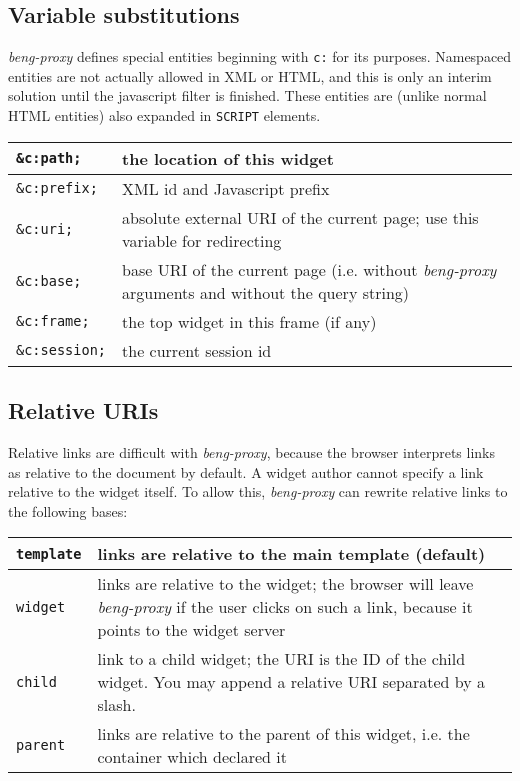 \documentclass[a4paper,12pt]{article}
\begin{document}
\subsection{Variable substitutions}

\emph{beng-proxy} defines special entities beginning with \texttt{c:}
for its purposes.  Namespaced entities are not actually allowed in XML
or HTML, and this is only an interim solution until the javascript
filter is finished.  These entities are (unlike normal HTML entities)
also expanded in \texttt{SCRIPT} elements.

\begin{tabular}{|l|p{8cm}|}
\hline
\texttt{\&c:path;} & the location of this widget \\
\hline
\texttt{\&c:prefix;} & XML id and Javascript prefix \\
\hline
\texttt{\&c:uri;} & absolute external URI of the current page; use
this variable for redirecting \\
\hline

\texttt{\&c:base;} & base URI of the current page (i.e. without
\emph{beng-proxy} arguments and without the query string) \\

\hline
\texttt{\&c:frame;} & the top widget in this frame (if any) \\
\hline
\texttt{\&c:session;} & the current session id \\
\hline
\end{tabular}

\subsection{Relative URIs}
\label{rewrite}

Relative links are difficult with \emph{beng-proxy}, because the
browser interprets links as relative to the document by default.  A
widget author cannot specify a link relative to the widget itself.  To
allow this, \emph{beng-proxy} can rewrite relative links to the
following bases:

\begin{tabular}{|l|p{10cm}|}
\hline

\texttt{template} & links are relative to the main template (default)
\\

\hline

\texttt{widget} & links are relative to the widget; the browser will
leave \emph{beng-proxy} if the user clicks on such a link, because it
points to the widget server \\

\hline

\texttt{child} & link to a child widget; the URI is the ID of the
child widget.  You may append a relative URI separated by a slash. \\

\hline

\texttt{parent} & links are relative to the parent of this widget,
i.e. the container which declared it \\

\hline
\end{tabular}
\end{document}
